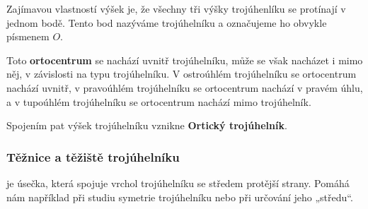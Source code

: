 \documentclass[12pt,a4paper]{article}
\begin{document}
Zajímavou vlastností výšek je, že všechny tři výšky trojúhenlíku se protínají v jednom bodě. 
Tento bod nazýváme  trojúhelníku a označujeme ho obvykle písmenem $O$.

Toto \textbf{ortocentrum} se nachází uvnitř trojúhelníku, může se však nacházet i mimo něj, v závislosti na typu trojúhelníku.
V ostroúhlém trojúhelníku se ortocentrum nachází uvnitř, v pravoúhlém trojúhelníku se ortocentrum nachází v pravém úhlu, a v tupoúhlém trojúhelníku se ortocentrum nachází mimo trojúhelník.

\begin{center}
\end{center}

\begin{notebox}
    Spojením pat výšek trojúhelníku vznikne \textbf{Ortický trojúhelník}.
\end{notebox}

\subsubsection*{Těžnice a těžiště trojúhelníku}

 je úsečka, která spojuje vrchol trojúhelníku se středem protější strany.
Pomáhá nám například při studiu symetrie trojúhelníku nebo při určování jeho „středu“.
\end{document}
